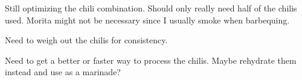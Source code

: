 \begin{experiments}
\item Still optimizing the chili combination.
	Should only really need half of the chilis used.
	Morita might not be necessary since I usually smoke when barbequing.

\item Need to weigh out the chilis for consistency.

\item Need to get a better or faster way to process the chilis.
	Maybe rehydrate them instead and use as a marinade?
\end{experiments}

\recipeend
